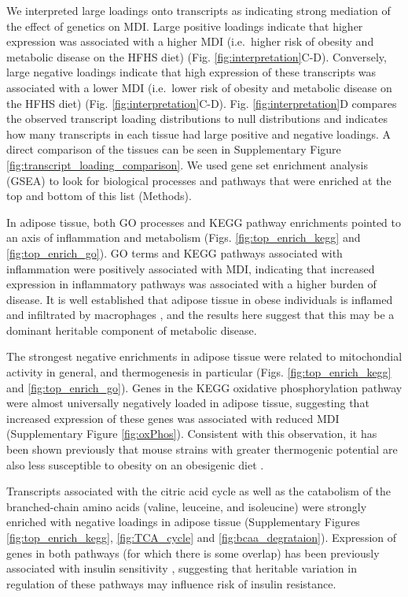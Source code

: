 \documentclass[
]{article}
\begin{document}
We interpreted large loadings onto transcripts as indicating strong
mediation of the effect of genetics on MDI. Large positive loadings
indicate that higher expression was associated with a higher MDI
(i.e.~higher risk of obesity and metabolic disease on the HFHS diet)
(Fig. \ref{fig:interpretation}C-D). Conversely, large negative loadings
indicate that high expression of these transcripts was associated with a
lower MDI (i.e.~lower risk of obesity and metabolic disease on the HFHS
diet) (Fig. \ref{fig:interpretation}C-D). Fig. \ref{fig:interpretation}D
compares the observed transcript loading distributions to null
distributions and indicates how many transcripts in each tissue had
large positive and negative loadings. A direct comparison of the tissues
can be seen in Supplementary Figure
\ref{fig:transcript_loading_comparison}. We used gene set enrichment
analysis (GSEA) \cite{fgsea, 
pmid16199517} to look for biological processes and pathways that were
enriched at the top and bottom of this list (Methods).

In adipose tissue, both GO processes and KEGG pathway enrichments
pointed to an axis of inflammation and metabolism (Figs.
\ref{fig:top_enrich_kegg} and \ref{fig:top_enrich_go}). GO terms and
KEGG pathways associated with inflammation were positively associated
with MDI, indicating that increased expression in inflammatory pathways
was associated with a higher burden of disease. It is well established
that adipose tissue in obese individuals is inflamed and infiltrated by
macrophages \cite{pmid19133410, 
pmid28955384, pmid28912810, pmid28901330, pmid24969772}, and the results
here suggest that this may be a dominant heritable component of
metabolic disease.

The strongest negative enrichments in adipose tissue were related to
mitochondial activity in general, and thermogenesis in particular (Figs.
\ref{fig:top_enrich_kegg} and \ref{fig:top_enrich_go}). Genes in the
KEGG oxidative phosphorylation pathway were almost universally
negatively loaded in adipose tissue, suggesting that increased
expression of these genes was associated with reduced MDI (Supplementary
Figure \ref{fig:oxPhos}). Consistent with this observation, it has been
shown previously that mouse strains with greater thermogenic potential
are also less susceptible to obesity on an obesigenic diet
\cite{pmid18492779}.

Transcripts associated with the citric acid cycle as well as the
catabolism of the branched-chain amino acids (valine, leuceine, and
isoleucine) were strongly enriched with negative loadings in adipose
tissue (Supplementary Figures \ref{fig:top_enrich_kegg},
\ref{fig:TCA_cycle} and \ref{fig:bcaa_degrataion}). Expression of genes
in both pathways (for which there is some overlap) has been previously
associated with insulin sensitivity \cite{pmid29567659, 
pmid22560213, pmid19841271}, suggesting that heritable variation in
regulation of these pathways may influence risk of insulin resistance.
\end{document}
